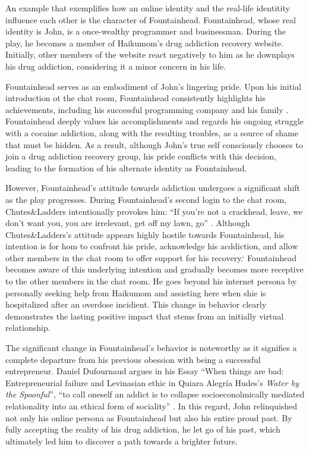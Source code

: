 \documentclass{mla}
\begin{document}
An example that exemplifies how an online identity and the real-life identitity influence each other is the character of Fountainhead.
Fountainhead, whose real identity is John, is a once-wealthy programmer and businessman.
During the play, he becomes a member of Haikumom's drug addiction recovery website.
Initially, other members of the website react negatively to him as he downplays his drug addiction, considering it a minor concern in his life.

Fountainhead serves as an embodiment of John's lingering pride.
Upon his initial introduction ot the chat room, Fountainhead consistently highlights his achievements, including his successful programming company and his family \autocite[23--24]{Hudes_2017}.
Fountainhead deeply values his accomplishments and regards his ongoing struggle with a cocaine addiction, along with the resulting troubles, as a source of shame that must be hidden.
As a result, although John's true self consciously chooses to join a drug addiction recovery group, his pride conflicts with this decision, leading to the formation of his alternate identity as Fountainhead.

However, Fountainhead's attitude towards addiction undergoes a significant shift as the play progresses.
During Fountainhead's second login to the chat room, Chutes\&Ladders intentionally provokes him: ``If you're not a crackhead, leave, we don't want you, you are irrelevant, get off my lawn, go'' \autocite[41]{Hudes_2017}.
Although Chutes\&Ladders's attitude appears highly hostile towards Fountainhead, his intention is for hom to confront his pride, acknowledge his acddiction, and allow other members in the chat room to offer support for his recovery.`
Fountainhead becomes aware of this underlying intention and gradually becomes more receptive to the other members in the chat room.
He goes beyond his internet persona by personally seeking help from Haikumom and assisting here when shie is hospitalized after an overdose incidient.
This change in behavior clearly demonstrates the lasting positive impact that stems from an initially virtual relationship.

The significant change in Fountainhead's behavior is noteworthy as it signifies a complete departure from his previous obession with being a successful entrepreneur.
Daniel Dufournaud argues in his Essay ``When things are bad: Entrepreneurial failure and Levinasian ethic in Quiara Alegr\'ia Hudes's \textit{Water by the Spoonful}'', ``to call oneself an addict is to collapse socioeconolmically mediated relationality into an ethical form of sociality'' \autocite[452]{Dufournaud_2020}.
In this regard, John relinquished not only his online persona as Fountainhead but also his entire proud past.
By fully accepting the reality of his drug addiction, he let go of his past, which ultimately led him to discover a path towards a brighter future.
\end{document}
